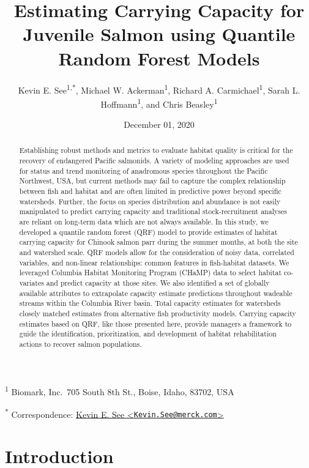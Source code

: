 \documentclass[
  12pt,
]{article}
\title{Estimating Carrying Capacity for Juvenile Salmon using Quantile Random Forest Models}
\author{Kevin E. See\textsuperscript{1,*}, Michael W. Ackerman\textsuperscript{1}, Richard A. Carmichael\textsuperscript{1}, Sarah L. Hoffmann\textsuperscript{1}, and Chris Beasley\textsuperscript{1}}
\date{December 01, 2020}
\begin{document}
\maketitle
\begin{abstract}
Establishing robust methods and metrics to evaluate habitat quality is critical for the recovery of endangered Pacific salmonids. A variety of modeling approaches are used for status and trend monitoring of anadromous species throughout the Pacific Northwest, USA, but current methods may fail to capture the complex relationship between fish and habitat and are often limited in predictive power beyond specific watersheds. Further, the focus on species distribution and abundance is not easily manipulated to predict carrying capacity and traditional stock-recruitment analyses are reliant on long-term data which are not always available. In this study, we developed a quantile random forest (QRF) model to provide estimates of habitat carrying capacity for Chinook salmon parr during the summer months, at both the site and watershed scale. QRF models allow for the consideration of noisy data, correlated variables, and non-linear relationships: common features in fish-habitat datasets. We leveraged Columbia Habitat Monitoring Program (CHaMP) data to select habitat co-variates and predict capacity at those sites. We also identified a set of globally available attributes to extrapolate capacity estimate predictions throughout wadeable streams within the Columbia River basin. Total capacity estimates for watersheds closely matched estimates from alternative fish productivity models. Carrying capacity estimates based on QRF, like those presented here, provide managers a framework to guide the identification, prioritization, and development of habitat rehabilitation actions to recover salmon populations.
\end{abstract}

\textsuperscript{1} Biomark, Inc.~705 South 8th St., Boise, Idaho, 83702, USA

\textsuperscript{*} Correspondence: \href{mailto:Kevin.See@merck.com}{Kevin E. See \textless{}\href{mailto:Kevin.See@merck.com}{\nolinkurl{Kevin.See@merck.com}}\textgreater{}}

\hypertarget{introduction}{%
\section{Introduction}\label{introduction}}
\end{document}
